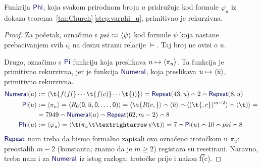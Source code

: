 \begin{lema}[{name=[primitivna rekurzivnost svođenja $K$ na $Valid$]}]
Funkcija $\f{Phi}$, koja svakom prirodnom broju $u$ pridružuje kod formule $\varphi_u$ iz dokaza teorema~\ref{tm:Church}\,\eqref{step:varphi_u}, primitivno je rekurzivna.
\end{lema}
\begin{proof}
    Za početak, označimo s $psi:=\langle\psi\rangle$ kod formule $\psi$ koja nastane prebacivanjem svih $\overline{\iota_i}$ na desnu stranu relacije $\models$. Taj broj ne ovisi o $u$.

Drugo, označimo s $\f{Pi}$ funkciju koja preslikava $u\mapsto\langle\pi_u\rangle$. Ta funkcija je primitivno rekurzivna, jer je funkcija $\f{Numeral}$, koja preslikava $u\mapsto\langle\overline u\rangle$, primitivno rekurzivna.
\begin{align}
    \f{Numeral}(u)&:=\kr{\t{f(f(}\dotsm\t{f(c)}\dotsm\t{))}}=\f{Repeat}(43,u)\conc{}2\conc{}\f{Repeat}(8,u)\\
    \f{Pi}(u)&:=\kr{\pi_u}=\kr{R_0(\mathsf0,\overline u,\mathsf0,\dotsc,\mathsf0)}=
    \kr{\t{R(c,}}\conc{}\kr{\overline u}\conc{}\kr{(\t{,c})^{m-2}}\conc{}\kr{\t)}=\notag\\
    &=7949\conc{}\f{Numeral}(u)\conc{}\f{Repeat}(62,m-2)\conc{}8\\
    \f{Phi}(u)&:=\kr{\varphi_u}=\kr{\t(\pi_u\!\,\t\textrightarrow\,\psi\t)}=7\conc{}\f{Pi}(u)\conc{}10\conc{}psi\conc{}8
\end{align}
    $\f{Repeat}$ nam treba da bismo formalno zapisali ovo označeno trotočkom u $\pi_u$: preostalih $m-2$ (konstanta; znamo da je $m\ge2$) registara su resetirani. Naravno, treba nam i za $\f{Numeral}$ iz istog razloga: trotočke prije i nakon \t{f(c)}.
\end{proof}

